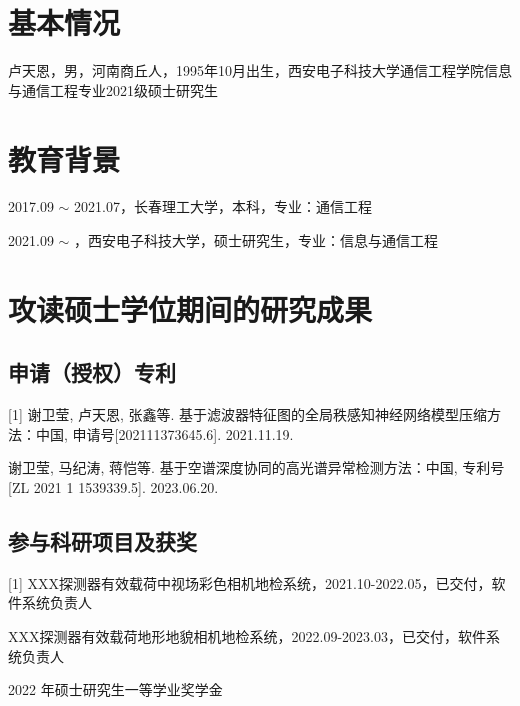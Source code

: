 \section{基本情况}
卢天恩，男，河南商丘人，1995年10月出生，西安电子科技大学通信工程学院信息与通信工程专业2021级硕士研究生

\section{教育背景}
2017.09 $\sim$ 2021.07，长春理工大学，本科，专业：通信工程
\par
2021.09 $\sim$ \quad\quad\hspace{15.0pt}，西安电子科技大学，硕士研究生，专业：信息与通信工程

\section{攻读硕士学位期间的研究成果}
\subsection{申请（授权）专利}
[1] 谢卫莹, 卢天恩, 张鑫等. 基于滤波器特征图的全局秩感知神经网络模型压缩方法：中国, 申请号[202111373645.6]. 2021.11.19.
\par
[2] 谢卫莹, 马纪涛, 蒋恺等. 基于空谱深度协同的高光谱异常检测方法：中国, 专利号[ZL 2021 1 1539339.5]. 2023.06.20.

\subsection{参与科研项目及获奖}
[1] XXX探测器有效载荷中视场彩色相机地检系统，2021.10-2022.05，已交付，软件系统负责人
\par
[2] XXX探测器有效载荷地形地貌相机地检系统，2022.09-2023.03，已交付，软件系统负责人
\par
[3] 2022 年硕士研究生一等学业奖学金

